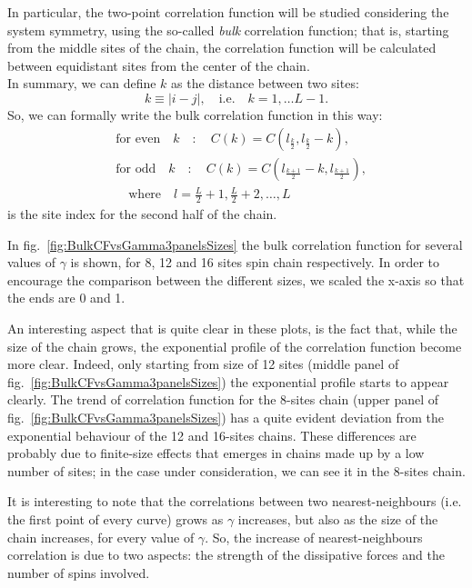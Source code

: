 In particular, the two-point correlation function will be studied considering the system symmetry, using the so-called \emph{bulk} correlation function; that is, starting from the middle sites of the chain, the correlation function will be calculated between equidistant sites from the center of the chain.
\\In summary, we can define $k$ as the distance between two sites:
\begin{equation*}
    k \equiv |i-j|, \quad \text{i.e.} \quad k = 1, \dots L-1.
\end{equation*}
So, we can formally write the bulk correlation function in this way:
\begin{equation*}
\begin{split}
    &\text{for even} \quad k \quad : \quad C(k) = C(l_{\frac{k}{2}}, l_{\frac{k}{2}}-k),\\
    &\text{for odd} \quad k \quad : \quad C(k) = C(l_{\frac{k+1}{2}}-k, l_{\frac{k+1}{2}}),\\
    & \quad \text{where} \quad l = \frac{L}{2}+1, \frac{L}{2}+2, \dots, L
\end{split}
\end{equation*}
is the site index for the second half of the chain.

In fig.~\ref{fig:BulkCFvsGamma3panelsSizes} the bulk correlation function for several values of $\gamma$ is shown, for 8, 12 and 16 sites spin chain respectively. In order to encourage the comparison between the different sizes, we scaled the x-axis so that the ends are 0 and 1. 


An interesting aspect that is quite clear in these plots, is the fact that, while the size of the chain grows, the exponential profile of the correlation function become more clear. Indeed, only starting from size of 12 sites (middle panel of fig.~\ref{fig:BulkCFvsGamma3panelsSizes}) the exponential profile starts to appear clearly. The trend of correlation function for the 8-sites chain (upper panel of fig.~\ref{fig:BulkCFvsGamma3panelsSizes}) has a quite evident deviation from the exponential behaviour of the 12 and 16-sites chains. These differences are probably due to finite-size effects that emerges in chains made up by a low number of sites; in the case under consideration, we can see it in the 8-sites chain.

It is interesting to note that the correlations between two nearest-neigh\-bours (i.e. the first point of every curve) grows as $\gamma$ increases, but also as the size of the chain increases, for every value of $\gamma$. So, the increase of nearest-neighbours correlation is due to two aspects: the strength of the dissipative forces and the number of spins involved.

